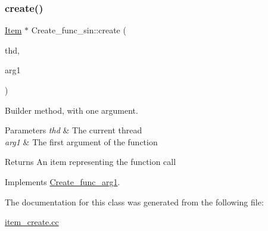 \subsubsection{\texorpdfstring{create()}{create()}}
{\footnotesize\ttfamily \mbox{\hyperlink{classItem}{Item}} $\ast$ Create\+\_\+func\+\_\+sin\+::create (\begin{DoxyParamCaption}\item[{T\+HD $\ast$}]{thd,  }\item[{\mbox{\hyperlink{classItem}{Item}} $\ast$}]{arg1 }\end{DoxyParamCaption})\hspace{0.3cm}{\ttfamily [virtual]}}

Builder method, with one argument. 
\begin{DoxyParams}{Parameters}
{\em thd} & The current thread \\
\hline
{\em arg1} & The first argument of the function \\
\hline
\end{DoxyParams}
\begin{DoxyReturn}{Returns}
An item representing the function call 
\end{DoxyReturn}


Implements \mbox{\hyperlink{classCreate__func__arg1_a3e9a98f755cd82c3e762e334c955a8c9}{Create\+\_\+func\+\_\+arg1}}.



The documentation for this class was generated from the following file\+:\begin{DoxyCompactItemize}
\item 
\mbox{\hyperlink{item__create_8cc}{item\+\_\+create.\+cc}}\end{DoxyCompactItemize}
